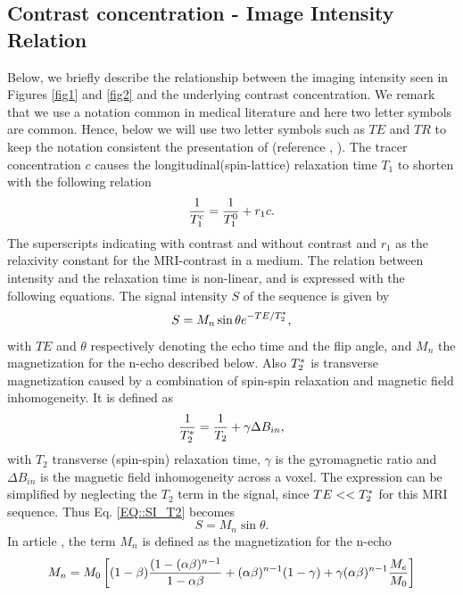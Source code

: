 \documentclass[11pt,a4paper]{article}
\begin{document}
\subsection*{Contrast concentration - Image Intensity Relation}
Below, we briefly describe the relationship between the imaging intensity 
seen in Figures \ref{fig1} and \ref{fig2} and the underlying contrast 
concentration. We remark that we use a notation common in medical literature and here two letter symbols are common. Hence, below we will use two letter symbols such as $TE$ and $TR$ to keep the notation consistent the presentation of (reference \cite{GOWLAND}, \cite{MPRAGE}).   
The tracer concentration $c$ causes the longitudinal(spin-lattice) relaxation time $T_{1}$ to shorten with the following relation
\begin{equation}
\frac{1}{T_{1}\sp{c}} = \frac{1}{T_{1}\sp{0}} + r_{1}c .
\label{EQ::contrast}
\end{equation}
The superscripts indicating with contrast and without contrast and $r_1$ as the relaxivity constant for the MRI-contrast in a medium. The relation between intensity and the relaxation time is non-linear, and is expressed with the following equations. The signal intensity $S$ of the sequence is given by
\begin{equation}
S = M_{n} \sin \theta e\sp{ - TE/T_2\sp{*} },
\label{EQ::SI_T2}
\end{equation}
with $TE$ and $\theta$ respectively denoting the echo time and the flip angle, and $M_{n}$ the magnetization for the n-echo described below. 
Also $T_2\sp{*}$ is transverse magnetization caused by a combination of spin-spin relaxation and magnetic field inhomogeneity. It is defined as 
\begin{equation}
\frac{1}{T_2\sp{*}} = \frac{1}{T_2} + \gamma \Delta B_{in} ,
\end{equation}
with $T_2$ transverse (spin-spin) relaxation time, $\gamma$ is the gyromagnetic ratio and $\Delta B_{in}$ is the magnetic field inhomogeneity across a voxel. The expression can be simplified by neglecting the $T_2$ term in the signal, since $TE <<T_2\sp{*}$ for this MRI sequence. Thus Eq. \ref{EQ::SI_T2} becomes 
\begin{equation}
S = M_{n} \sin \theta.
\label{EQ::SI}
\end{equation}
In article  \cite{MPRAGE}, the term $M_n$ is defined as the magnetization for the n-echo 
\begin{equation}
M_{n} = M_{0}  \left[ (1-\beta)\frac{(1-(\alpha \beta)\sp{n-1} }{1-\alpha\beta} + (\alpha \beta)\sp{n-1}(1-\gamma) + \gamma ( \alpha \beta)\sp{n-1} \frac{M_{e}}{M_{0}}  \right]   
\end{equation}
\end{document}
